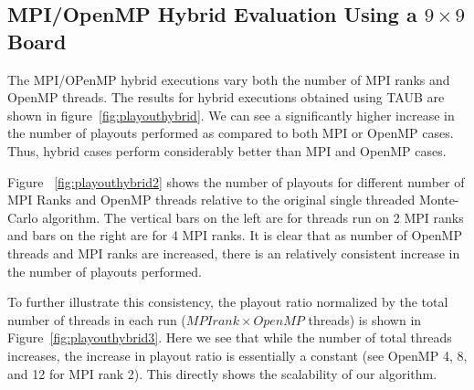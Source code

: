\documentclass[nocopyrightspace, 10pt]{sigplanconf}
\begin{document}
\subsection{MPI/OpenMP Hybrid Evaluation Using a $9 \times 9$ Board}
The MPI/OPenMP hybrid executions vary both the number of MPI ranks and OpenMP threads. The results for hybrid executions obtained using TAUB are shown in figure~\ref{fig:playouthybrid}. We can see a significantly higher increase in the number of playouts performed as compared to both MPI or OpenMP cases. Thus, hybrid cases perform considerably better than MPI and OpenMP cases.

Figure ~\ref{fig:playouthybrid2} shows the number of playouts for different number of MPI Ranks and OpenMP threads relative to the original single threaded Monte-Carlo algorithm. The vertical bars on the left are for threads run on 2 MPI ranks and bars on the right are for 4 MPI ranks. It is clear that as number of OpenMP threads and MPI ranks are increased, there is an relatively consistent increase in the number of playouts performed. 

To further illustrate this consistency, the playout ratio normalized by the total number of threads in each run ($MPI rank \times OpenMP$ threads) is shown in Figure~\ref{fig:playouthybrid3}. Here we see that while the number of total threads increases, the increase in playout ratio is essentially a constant (see OpenMP 4, 8, and 12 for MPI rank 2). This directly shows the scalability of our algorithm.


\end{document}
